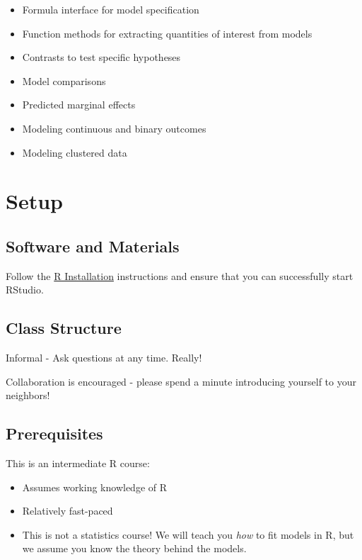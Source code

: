 \documentclass[
]{book}
\providecommand{\tightlist}{%
  \setlength{\itemsep}{0pt}\setlength{\parskip}{0pt}}
\begin{document}
\begin{itemize}
\tightlist
\item
  Formula interface for model specification
\item
  Function methods for extracting quantities of interest from models
\item
  Contrasts to test specific hypotheses
\item
  Model comparisons
\item
  Predicted marginal effects
\item
  Modeling continuous and binary outcomes
\item
  Modeling clustered data
\end{itemize}

\hypertarget{setup-1}{%
\section{Setup}\label{setup-1}}

\hypertarget{software-and-materials-1}{%
\subsection{Software and Materials}\label{software-and-materials-1}}

Follow the \href{./Rinstall.html}{R Installation} instructions and ensure that you can successfully start RStudio.

\hypertarget{class-structure-1}{%
\subsection{Class Structure}\label{class-structure-1}}

Informal - Ask questions at any time. Really!

Collaboration is encouraged - please spend a minute introducing yourself to your neighbors!

\hypertarget{prerequisites-1}{%
\subsection{Prerequisites}\label{prerequisites-1}}

This is an intermediate R course:

\begin{itemize}
\tightlist
\item
  Assumes working knowledge of R
\item
  Relatively fast-paced
\item
  This is not a statistics course! We will teach you \emph{how} to fit models in R, but we assume you know the theory behind the models.
\end{itemize}
\end{document}
